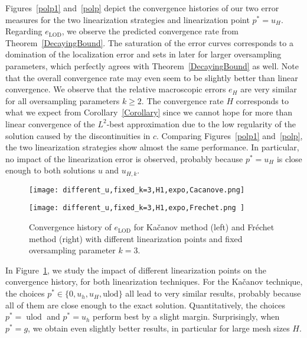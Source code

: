 \documentclass{article}
\begin{document}
Figures~\ref{polp1} and~\ref{polp} depict the convergence histories of our two error measures for the two linearization strategies and linearization point $p^*=u_H$. Regarding $e_{\operatorname{LOD}}$, we observe the predicted convergence rate from Theorem~\ref{DecayingBound}. The saturation of the error curves corresponds to a domination of the localization error and sets in later for larger oversampling parameters, which perfectly agrees with Theorem~\ref{DecayingBound} as well. Note that the overall convergence rate may even seem to be slightly better than linear convergence.
 We observe that the relative macroscopic errors $e_H$ are very similar for all oversampling parameters $k\geq2$. The convergence rate $H$ corresponds to what we expect from Corollary~\ref{Corollary} since we cannot hope for more than linear convergence of the $L^2$-best approximation due to the low regularity of the solution caused by the discontinuities in $c$.
Comparing Figures~\ref{polp1} and~\ref{polp}, the two linearization strategies show almost the same performance. In particular, no impact of the linearization error is observed, probably because $p^*=u_H$ is close enough to both solutions $u$ and $u_{H,k}$. 
\begin{figure}[ht]
    \centering
    \begin{minipage}{0.49\textwidth}
         \centering  
    \texttt{[image: different\_u,fixed\_k=3,H1,expo,Cacanove.png]} 
      
    \end{minipage}
    \hfill
    \begin{minipage}{0.49\textwidth}
       \centering  
    \texttt{[image: different\_u,fixed\_k=3,H1,expo,Frechet.png ]} 
    
    
    \end{minipage}
    
    
    \caption{Convergence history of $e_{\operatorname{LOD}}$ for
    Kačanov method (left) and Fréchet method (right) with different linearization points and fixed oversampling parameter $k=3$.}\label{exp_comparion_the_same_methods}
\end{figure}
In Figure~\ref{exp_comparion_the_same_methods}, we study the impact of different linearization points on the convergence history, for both linearization techniques. For the Kačanov technique, the choices $p^* \in \{0,u_h,u_H,\text{ulod}\}$ all lead to very similar results, probably because all of them are close enough to the exact solution. Quantitatively, the choices $p^*= \operatorname{ulod}$ and $p^*= u_h$ perform best by a slight margin. Surprisingly, when $p^*=g$, we obtain even slightly better results, in particular for large mesh sizes $H$. %
\end{document}
